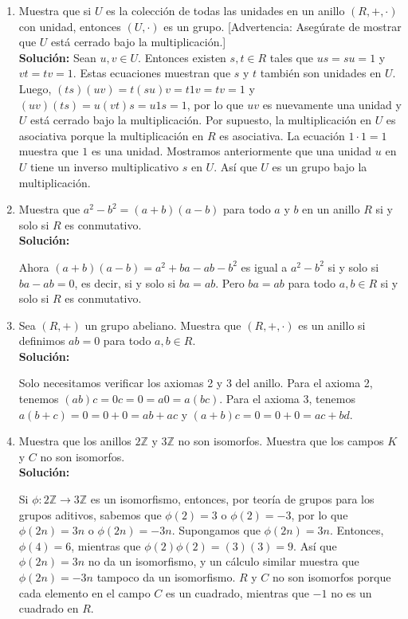 \begin{enumerate}
\begin{itemize}
	\end{itemize}
	\item Muestra que si $U$ es la colección de todas las unidades en un anillo $(R, +, \cdot)$ con unidad, entonces $(U, \cdot)$ es un grupo. [Advertencia: Asegúrate de mostrar que $U$ está cerrado bajo la multiplicación.]
	\\ \textbf{Solución:}
	Sean $u, v \in U$. Entonces existen $s, t \in R$ tales que $us = su = 1$ y $vt = tv = 1$. Estas ecuaciones muestran que $s$ y $t$ también son unidades en $U$. Luego, $(ts)(uv) = t(su)v = t1v = tv = 1$ y $(uv)(ts) = u(vt)s = u1s = 1$, por lo que $uv$ es nuevamente una unidad y $U$ está cerrado bajo la multiplicación. Por supuesto, la multiplicación en $U$ es asociativa porque la multiplicación en $R$ es asociativa. La ecuación $1 \cdot 1 = 1$ muestra que $1$ es una unidad. Mostramos anteriormente que una unidad $u$ en $U$ tiene un inverso multiplicativo $s$ en $U$. Así que $U$ es un grupo bajo la multiplicación.
	
	\item Muestra que $a^2 - b^2 = (a + b)(a - b)$ para todo $a$ y $b$ en un anillo $R$ si y solo si $R$ es conmutativo.
	\\ \textbf{Solución:}
	
	Ahora $(a + b)(a - b) = a^2 + ba - ab - b^2$ es igual a $a^2 - b^2$ si y solo si $ba - ab = 0$, es decir, si y solo si $ba = ab$. Pero $ba = ab$ para todo $a, b \in R$ si y solo si $R$ es conmutativo.
	
	\item  Sea $(R, +)$ un grupo abeliano. Muestra que $(R, +, \cdot)$ es un anillo si definimos $ab = 0$ para todo $a, b \in R$.
	\\ \textbf{Solución:}
	
	Solo necesitamos verificar los axiomas 2 y 3 del anillo. Para el axioma 2, tenemos $(ab)c = 0c = 0 = a0 = a(bc)$. Para el axioma 3, tenemos $a(b + c) = 0 = 0 + 0 = ab + ac$ y $(a + b)c = 0 = 0 + 0 = ac + bd$.
	
	\item Muestra que los anillos $2\mathbb{Z}$ y $3\mathbb{Z}$ no son isomorfos. Muestra que los campos $K$ y $C$ no son isomorfos.
	\\ \textbf{Solución:}
	
	Si $\phi: 2\mathbb{Z} \to 3\mathbb{Z}$ es un isomorfismo, entonces, por teoría de grupos para los grupos aditivos, sabemos que $\phi(2) = 3$ o $\phi(2) = -3$, por lo que $\phi(2n) = 3n$ o $\phi(2n) = -3n$. Supongamos que $\phi(2n) = 3n$. Entonces, $\phi(4) = 6$, mientras que $\phi(2)\phi(2) = (3)(3) = 9$. Así que $\phi(2n) = 3n$ no da un isomorfismo, y un cálculo similar muestra que $\phi(2n) = -3n$ tampoco da un isomorfismo. $R$ y $C$ no son isomorfos porque cada elemento en el campo $C$ es un cuadrado, mientras que $-1$ no es un cuadrado en $R$.
	

\end{enumerate}
